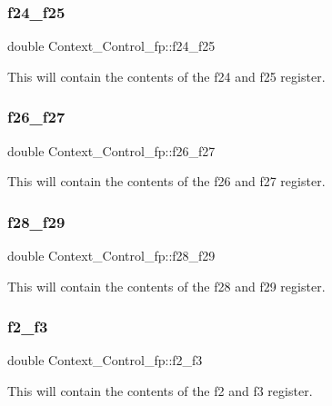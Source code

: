 \subsubsection{\texorpdfstring{f24\_f25}{f24\_f25}}
{\footnotesize\ttfamily double Context\+\_\+\+Control\+\_\+fp\+::f24\+\_\+f25}

This will contain the contents of the f24 and f25 register. \mbox{\label{structContext__Control__fp_a51ba732fd8c3ec19d03a08ed95f94b34}} 
\subsubsection{\texorpdfstring{f26\_f27}{f26\_f27}}
{\footnotesize\ttfamily double Context\+\_\+\+Control\+\_\+fp\+::f26\+\_\+f27}

This will contain the contents of the f26 and f27 register. \mbox{\label{structContext__Control__fp_a1810834802ee57204517766ea34ea1cc}} 
\subsubsection{\texorpdfstring{f28\_f29}{f28\_f29}}
{\footnotesize\ttfamily double Context\+\_\+\+Control\+\_\+fp\+::f28\+\_\+f29}

This will contain the contents of the f28 and f29 register. \mbox{\label{structContext__Control__fp_a2c7ef370df836f18835ae909986141e7}} 
\subsubsection{\texorpdfstring{f2\_f3}{f2\_f3}}
{\footnotesize\ttfamily double Context\+\_\+\+Control\+\_\+fp\+::f2\+\_\+f3}

This will contain the contents of the f2 and f3 register. \mbox{\label{structContext__Control__fp_a8529c41bb60c453dadf3660489e26365}} 

